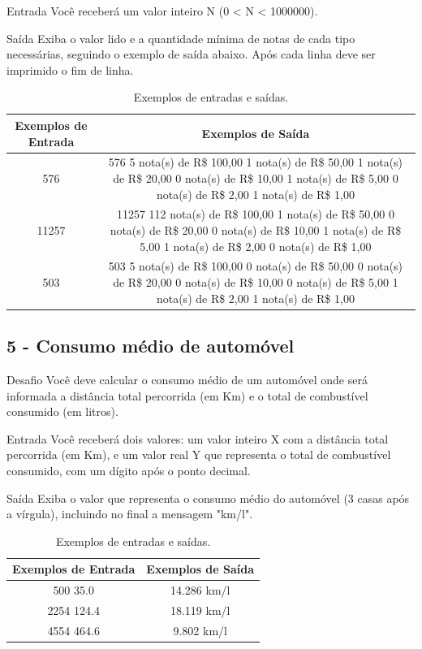 \documentclass[12pt,a4paper]{article}
\begin{document}
	Entrada
	Você receberá um valor inteiro N (0 < N < 1000000).
	
	Saída
	Exiba o valor lido e a quantidade mínima de notas de cada tipo necessárias, seguindo o exemplo de saída abaixo. Após cada linha deve ser imprimido o fim de linha.
	
	\begin{table}[!htpb]
		\centering
		\begin{tabular}{|c|c|}
			\hline
			Exemplos de Entrada & Exemplos de Saída \\
			\hline
			576 & 576
			5 nota(s) de R\$ 100,00
			1 nota(s) de R\$ 50,00
			1 nota(s) de R\$ 20,00
			0 nota(s) de R\$ 10,00
			1 nota(s) de R\$ 5,00
			0 nota(s) de R\$ 2,00
			1 nota(s) de R\$ 1,00\\
			\hline
			11257 & 11257
			112 nota(s) de R\$ 100,00
			1 nota(s) de R\$ 50,00
			0 nota(s) de R\$ 20,00
			0 nota(s) de R\$ 10,00
			1 nota(s) de R\$ 5,00
			1 nota(s) de R\$ 2,00
			0 nota(s) de R\$ 1,00\\
			\hline
			503 & 503
			5 nota(s) de R\$ 100,00
			0 nota(s) de R\$ 50,00
			0 nota(s) de R\$ 20,00
			0 nota(s) de R\$ 10,00
			0 nota(s) de R\$ 5,00
			1 nota(s) de R\$ 2,00
			1 nota(s) de R\$ 1,00\\
			\hline
		\end{tabular}
		\caption{Exemplos de entradas e saídas.}
		\label{tab:valEntradasSaidas4}
	\end{table}
	
	\subsection{5 - Consumo médio de automóvel}
	
	Desafio
	Você deve calcular o consumo médio de um automóvel onde será informada a distância total percorrida (em Km) e o total de combustível consumido (em litros).
	
	Entrada
	Você receberá dois valores: um valor inteiro X com a distância total percorrida (em Km), e um valor real Y que representa o total de combustível consumido, com um dígito após o ponto decimal.
	
	Saída
	Exiba o valor que representa o consumo médio do automóvel (3 casas após a vírgula), incluindo no final a mensagem "km/l".
	
	\begin{table}[!htpb]
		\centering
		\begin{tabular}{|c|c|}
			\hline
			Exemplos de Entrada & Exemplos de Saída \\
			\hline
			500
			35.0 & 14.286 km/l\\
			\hline
			2254
			124.4 & 18.119 km/l\\
			\hline
			4554
			464.6 & 9.802 km/l\\
			\hline
		\end{tabular}
		\caption{Exemplos de entradas e saídas.}
		\label{tab:valEntradasSaidas5}
	\end{table}
	
\end{document}

